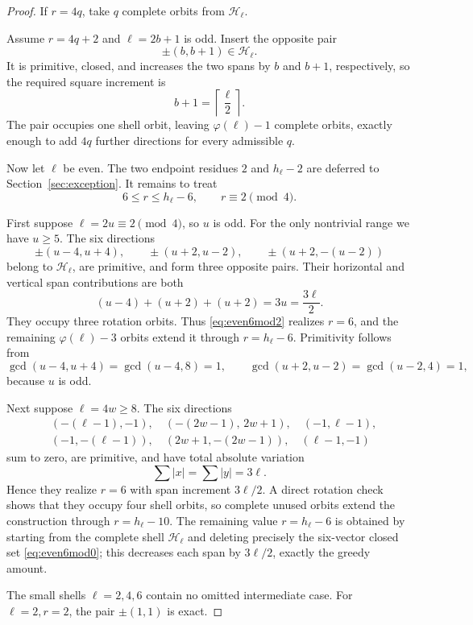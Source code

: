 \documentclass[11pt]{article}
\theoremstyle{definition}
\newcommand{\HH}{\mathcal H}
\newcommand{\ph}{\varphi}
\begin{document}
\begin{proof}
If \(r=4q\), take \(q\) complete orbits from \(\HH_\ell\).

Assume \(r=4q+2\) and \(\ell=2b+1\) is odd.  Insert the opposite pair
\[
\pm(b,b+1)\in\HH_\ell.
\]
It is primitive, closed, and increases the two spans by \(b\) and \(b+1\), respectively, so the required square increment is
\[
b+1=\left\lceil\frac{\ell}{2}\right\rceil.
\]
The pair occupies one shell orbit, leaving \(\ph(\ell)-1\) complete orbits, exactly enough to add \(4q\) further directions for every admissible \(q\).

Now let \(\ell\) be even.  The two endpoint residues \(2\) and \(h_\ell-2\) are deferred to Section~\ref{sec:exception}.  It remains to treat
\[
6\le r\le h_\ell-6,\qquad r\equiv2\pmod4.
\]

First suppose \(\ell=2u\equiv2\pmod4\), so \(u\) is odd.  For the only nontrivial range we have \(u\ge5\).  The six directions
\begin{equation}\label{eq:even6mod2}
\pm(u-4,u+4),\qquad
\pm(u+2,u-2),\qquad
\pm(u+2,-(u-2))
\end{equation}
belong to \(\HH_\ell\), are primitive, and form three opposite pairs.  Their horizontal and vertical span contributions are both
\[
(u-4)+(u+2)+(u+2)=3u=\frac{3\ell}{2}.
\]
They occupy three rotation orbits.  Thus \eqref{eq:even6mod2} realizes \(r=6\), and the remaining \(\ph(\ell)-3\) orbits extend it through \(r=h_\ell-6\).  Primitivity follows from
\[
\gcd(u-4,u+4)=\gcd(u-4,8)=1,\qquad
\gcd(u+2,u-2)=\gcd(u-2,4)=1,
\]
because \(u\) is odd.

Next suppose \(\ell=4w\ge8\).  The six directions
\begin{equation}\label{eq:even6mod0}
\begin{split}
&(-(\ell-1),-1),\quad (-(2w-1),\,2w+1),\quad (-1,\ell-1),\\
&(-1,-(\ell-1)),\quad (2w+1,-(2w-1)),\quad (\ell-1,-1)
\end{split}
\end{equation}
sum to zero, are primitive, and have total absolute variation
\[
\sum|x|=\sum|y|=3\ell.
\]
Hence they realize \(r=6\) with span increment \(3\ell/2\).  A direct rotation check shows that they occupy four shell orbits, so complete unused orbits extend the construction through \(r=h_\ell-10\).  The remaining value \(r=h_\ell-6\) is obtained by starting from the complete shell \(\HH_\ell\) and deleting precisely the six-vector closed set \eqref{eq:even6mod0}; this decreases each span by \(3\ell/2\), exactly the greedy amount.

The small shells \(\ell=2,4,6\) contain no omitted intermediate case.  For \(\ell=2,r=2\), the pair \(\pm(1,1)\) is exact.
\end{proof}
\end{document}

